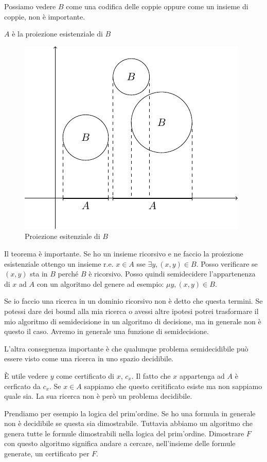 Possiamo vedere $B$ come una codifica delle coppie oppure come un insieme di coppie, non è
importante.

$A$ è la proiezione esistenziale di $B$ 

\begin{figure}[h]
    \centering
    \includegraphics{img/ExistentialProjection.pdf}
    \caption{Proiezione esitenziale di $B$}
\end{figure}

Il teorema è importante. Se ho un insieme ricorsivo e ne faccio la proiezione esistenziale ottengo
un insieme r.e. $x \in A$ sse $\exists y, (x,y) \in B$. Posso verificare se $(x,y)$ sta in $B$
perché $B$ è ricorsivo. Posso quindi semidecidere l'appartenenza di $x$ ad $A$ con un algoritmo del
genere ad esempio: $\mu y, (x,y) \in B$.

Se io faccio una ricerca in un dominio ricorsivo non è detto che questa termini. Se potessi dare dei
bound alla mia ricerca o avessi altre ipotesi potrei trasformare il mio algoritmo di semidecisione
in un algoritmo di decisione, ma in generale non è questo il caso. Avremo in generale una funzione
di semidecisione.

L'altra conseguenza importante è che qualunque problema semidecidibile può essere visto come una
ricerca in uno spazio decidibile.

È utile vedere $y$ come certificato di $x$, $c_{x}$. Il fatto che $x$ appartenga ad $A$ è cerficato da
$c_{x}$. Se $x \in A$ sappiamo che questo ceritificato esiste ma non sappiamo quale sia. La sua
ricerca non è però un problema decidibile.

Prendiamo per esempio la logica del prim'ordine. Se ho una formula in generale non è decidibile se
questa sia dimostrabile. Tuttavia abbiamo un algoritmo che genera tutte le formule dimostrabili nella
logica del prim'ordine. Dimostrare $F$ con questo algoritmo significa andare a cercare, nell'insieme
delle formule generate, un certificato per $F$. 

